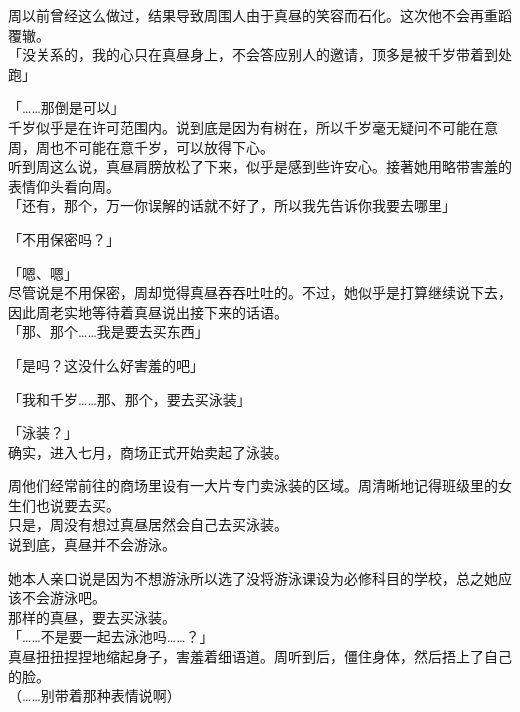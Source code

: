 周以前曾经这么做过，结果导致周围人由于真昼的笑容而石化。这次他不会再重蹈覆辙。\\

「没关系的，我的心只在真昼身上，不会答应别人的邀请，顶多是被千岁带着到处跑」

「……那倒是可以」\\

千岁似乎是在许可范围内。说到底是因为有树在，所以千岁毫无疑问不可能在意周，周也不可能在意千岁，可以放得下心。\\

听到周这么说，真昼肩膀放松了下来，似乎是感到些许安心。接著她用略带害羞的表情仰头看向周。\\

「还有，那个，万一你误解的话就不好了，所以我先告诉你我要去哪里」

「不用保密吗？」

「嗯、嗯」\\

尽管说是不用保密，周却觉得真昼吞吞吐吐的。不过，她似乎是打算继续说下去，因此周老实地等待着真昼说出接下来的话语。\\

「那、那个……我是要去买东西」

「是吗？这没什么好害羞的吧」

「我和千岁……那、那个，要去买泳装」

「泳装？」\\

确实，进入七月，商场正式开始卖起了泳装。

周他们经常前往的商场里设有一大片专门卖泳装的区域。周清晰地记得班级里的女生们也说要去买。\\

只是，周没有想过真昼居然会自己去买泳装。\\

说到底，真昼并不会游泳。

她本人亲口说是因为不想游泳所以选了没将游泳课设为必修科目的学校，总之她应该不会游泳吧。\\

那样的真昼，要去买泳装。\\

「……不是要一起去泳池吗……？」\\

真昼扭扭捏捏地缩起身子，害羞着细语道。周听到后，僵住身体，然后捂上了自己的脸。\\

（……别带着那种表情说啊）\\

